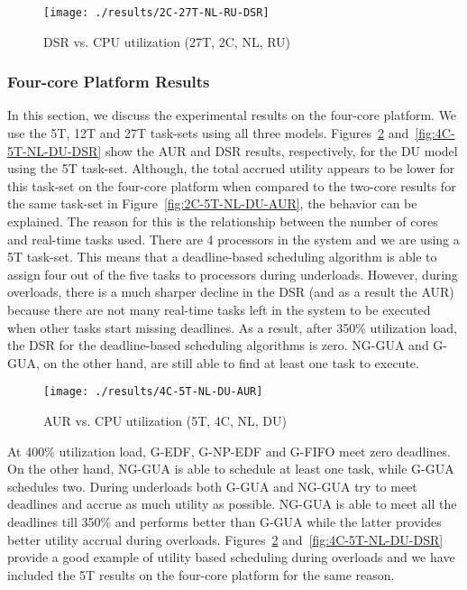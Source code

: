 \documentclass[12pt,dvips]{report}
\begin{document}
\begin{figure} [htbp]
  \centering
  \texttt{[image: ./results/2C-27T-NL-RU-DSR]}
  \caption{DSR vs. CPU utilization (27T, 2C, NL, RU)}
  \label{fig:2C-27T-NL-RU-DSR}
\end{figure}
 
 
\subsubsection{Four-core Platform Results} 
  
In this section, we discuss the experimental results on the four-core platform. We use the 5T, 12T and 27T task-sets using all three models. Figures~\ref{fig:4C-5T-NL-DU-AUR} and~\ref{fig:4C-5T-NL-DU-DSR} show the AUR and DSR results, respectively, for the DU model using the 5T task-set. Although, the total accrued utility appears to be lower for this task-set on the four-core platform when compared to the two-core results for the same task-set in Figure~\ref{fig:2C-5T-NL-DU-AUR}, the behavior can be explained. The reason for this is the relationship between the number of cores and real-time tasks used. There are 4 processors in the system and we are using a 5T task-set. This means that a deadline-based scheduling algorithm is able to assign four out of the five tasks to processors during underloads. However, during overloads, there is a much sharper decline in the DSR (and as a result the AUR) because there are not many real-time tasks left in the system to be executed when other tasks start missing deadlines. As a result, after 350\% utilization load, the DSR for the deadline-based scheduling algorithms is zero. NG-GUA and G-GUA, on the other hand, are still able to find at least one task to execute. 

\begin{figure} [htbp]
  \centering
  \texttt{[image: ./results/4C-5T-NL-DU-AUR]}
  \caption{AUR vs. CPU utilization (5T, 4C, NL, DU)}
  \label{fig:4C-5T-NL-DU-AUR}
\end{figure}
 
At 400\% utilization load, G-EDF, G-NP-EDF and G-FIFO meet zero deadlines. On the other hand, NG-GUA is able to schedule at least one task, while G-GUA schedules two. During underloads both G-GUA and NG-GUA try to meet deadlines and accrue as much utility as possible. NG-GUA is able to meet all the deadlines till 350\% and performs better than G-GUA while the latter provides better utility accrual during overloads. Figures~\ref{fig:4C-5T-NL-DU-AUR} and~\ref{fig:4C-5T-NL-DU-DSR} provide a good example of utility based scheduling during overloads and we have included the 5T results on the four-core platform for the same reason.
\end{document}
